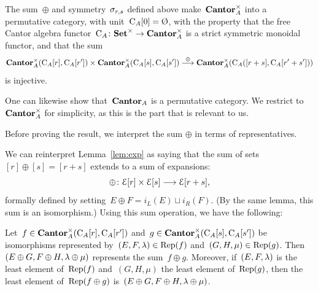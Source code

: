 \begin{prop}\label{injectiveAut}
The sum~$\oplus$ and symmetry~$\sigma_{r,s}$ defined above make~$\mathbf{Cantor}_A^\times$  into a  permutative category, with unit~$\rmC_A[0]=\emptyset$, with the property that 
 the free Cantor algebra functor~$\mathrm{C}_A\colon\mathbf{Set}^\times\to \mathbf{Cantor}_A^\times$  is a strict symmetric monoidal functor, and that the sum 
\[
\mathbf{Cantor}^\times_A(\mathrm{C}_A[r],\mathrm{C}_A[r'])\times \mathbf{Cantor}_A^\times(\mathrm{C}_A[s],\mathrm{C}_A[s'])\stackrel{\oplus}{\longrightarrow} \mathbf{Cantor}_A^\times(\mathrm{C}_A([r+s],\mathrm{C}_A[r'+s']))
\]
is injective. 
\end{prop}


One can likewise show that~$\mathbf{Cantor}_A$ is a permutative category. We restrict to~$\mathbf{Cantor}^\times_A$ for simplicity, as this is the part that is relevant to us. 

Before proving the result, we interpret the sum $\oplus$ in terms of representatives. 


We can reinterpret Lemma~\ref{lem:exp} as saying that the sum of sets~$[r]\oplus [s]=[r+s]$ extends to a sum of expansions: 
\[
\oplus\colon\mathcal{E}[r]\times \mathcal{E}[s]\longrightarrow \mathcal{E}[r+s], 
\]
formally defined by setting~$E\oplus F=i_L(E)\sqcup i_R(F)$. (By the same lemma, this sum is an isomorphism.) Using this sum operation, we have the following: 

\begin{lem}\label{lem:sumrep}
Let~$f\in \mathbf{Cantor}_A^\times(\mathrm{C}_A[r],\mathrm{C}_A[r'])$ and~$g\in \mathbf{Cantor}_A^\times(\mathrm{C}_A[s],\mathrm{C}_A[s'])$ be isomorphisms represented by~$(E,F,\lambda)\in \operatorname{Rep}(f)$ and~$(G,H,\mu)\in \operatorname{Rep}(g)$. Then~\hbox{$(E\oplus G,F\oplus H,\lambda\oplus \mu)$} represents the sum~\hbox{$f\oplus g$}. Moreover, if~$(E,F,\lambda)$ is the least element of~$\operatorname{Rep}(f)$ and~$(G,H,\mu)$ the least element of~$\operatorname{Rep}(g)$, then the least element of~$ \operatorname{Rep}(f\oplus g)$ is~\hbox{$(E\oplus G,F\oplus H,\lambda\oplus \mu)$}.
\end{lem}

